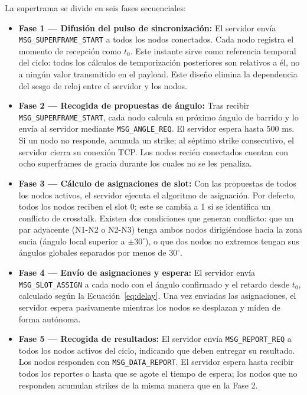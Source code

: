 La supertrama se divide en seis fases secuenciales:

\begin{itemize}[topsep=4pt, partopsep=0pt, itemsep=6pt, parsep=0pt]
    \item \textbf{Fase 1 --- Difusión del pulso de sincronización:} El servidor envía \texttt{MSG\_SUPERFRAME\_START} a todos los nodos conectados. Cada nodo registra el momento de recepción como $t_0$. Este instante sirve como referencia temporal del ciclo: todos los cálculos de temporización posteriores son relativos a él, no a ningún valor transmitido en el payload. Este diseño elimina la dependencia del sesgo de reloj entre el servidor y los nodos.

    \item \textbf{Fase 2 --- Recogida de propuestas de ángulo:} Tras recibir \texttt{MSG\_SUPERFRAME\_START}, cada nodo calcula su próximo ángulo de barrido y lo envía al servidor mediante \texttt{MSG\_ANGLE\_REQ}. El servidor espera hasta 500 ms. Si un nodo no responde, acumula un strike; al séptimo strike consecutivo, el servidor cierra su conexión TCP. Los nodos recién conectados cuentan con ocho superframes de gracia durante los cuales no se les penaliza.

    \item \textbf{Fase 3 --- Cálculo de asignaciones de slot:} Con las propuestas de todos los nodos activos, el servidor ejecuta el algoritmo de asignación. Por defecto, todos los nodos reciben el slot 0; este se cambia a 1 si se identifica un conflicto de crosstalk. Existen dos condiciones que generan conflicto: que un par adyacente (N1-N2 o N2-N3) tenga ambos nodos dirigiéndose hacia la zona sucia (ángulo local superior a $\pm 30^{\circ}$), o que dos nodos no extremos tengan sus ángulos globales separados por menos de $30^{\circ}$.

    \item \textbf{Fase 4 --- Envío de asignaciones y espera:} El servidor envía \texttt{MSG\_SLOT\_ASSIGN} a cada nodo con el ángulo confirmado y el retardo desde $t_0$, calculado según la Ecuación~\ref{eq:delay}. Una vez enviadas las asignaciones, el servidor espera pasivamente mientras los nodos se desplazan y miden de forma autónoma.

    \item \textbf{Fase 5 --- Recogida de resultados:} El servidor envía \texttt{MSG\_REPORT\_REQ} a todos los nodos activos del ciclo, indicando que deben entregar su resultado. Los nodos responden con \texttt{MSG\_DATA\_REPORT}. El servidor espera hasta recibir todos los reportes o hasta que se agote el tiempo de espera; los nodos que no responden acumulan strikes de la misma manera que en la Fase 2.


\end{itemize}
